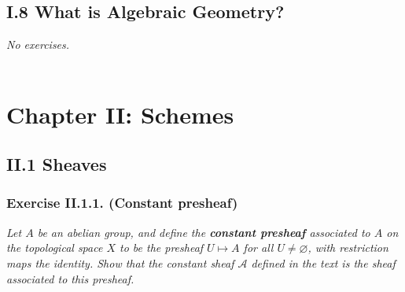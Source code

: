 \documentclass{article}
\begin{document}



\subsection*{I.8 What is Algebraic Geometry? \\}



\emph{No exercises.} \\\\






\newpage
\section*{Chapter II: Schemes \\}



\subsection*{II.1 Sheaves \\}



\subsubsection*{Exercise II.1.1. (Constant presheaf)}
\emph{Let $A$ be an abelian group, and define the \textbf{constant presheaf}
associated to $A$ on the topological space $X$ to be
the presheaf $U \mapsto A$ for all $U \neq \varnothing$,
with restriction maps the identity.
Show that the constant sheaf $\mathscr{A}$ defined in the text is
the sheaf associated to this presheaf.} \\
\end{document}
